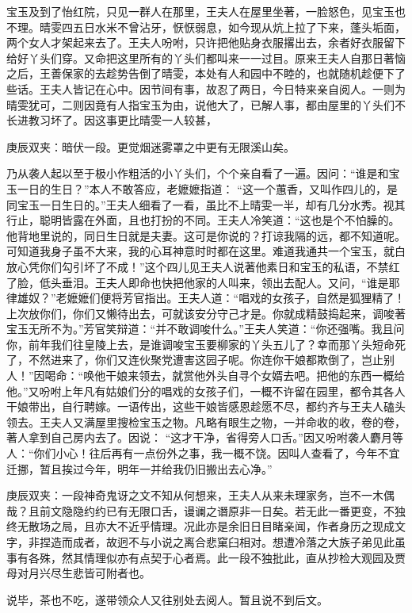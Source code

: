 \begin{parag}
    宝玉及到了怡红院，只见一群人在那里，王夫人在屋里坐著，一脸怒色，见宝玉也不理。晴雯四五日水米不曾沾牙，恹恹弱息，如今现从炕上拉了下来，蓬头垢面，两个女人才架起来去了。王夫人吩咐，只许把他贴身衣服撂出去，余者好衣服留下给好丫头们穿。又命把这里所有的丫头们都叫来一一过目。原来王夫人自那日著恼之后，王善保家的去趁势告倒了晴雯，本处有人和园中不睦的，也就随机趁便下了些话。王夫人皆记在心中。因节间有事，故忍了两日，今日特来亲自阅人。一则为晴雯犹可，二则因竟有人指宝玉为由，说他大了，已解人事，都由屋里的丫头们不长进教习坏了。因这事更比晴雯一人较甚，\begin{note}庚辰双夹：暗伏一段。更觉烟迷雾罩之中更有无限溪山矣。\end{note}乃从袭人起以至于极小作粗活的小丫头们，个个亲自看了一遍。因问：“谁是和宝玉一日的生日？”本人不敢答应，老嬷嬷指道： “这一个蕙香，又叫作四儿的，是同宝玉一日生日的。”王夫人细看了一看，虽比不上晴雯一半，却有几分水秀。视其行止，聪明皆露在外面，且也打扮的不同。王夫人冷笑道：“这也是个不怕臊的。他背地里说的，同日生日就是夫妻。这可是你说的？打谅我隔的远，都不知道呢。可知道我身子虽不大来，我的心耳神意时时都在这里。难道我通共一个宝玉，就白放心凭你们勾引坏了不成！”这个四儿见王夫人说著他素日和宝玉的私语，不禁红了脸，低头垂泪。王夫人即命也快把他家的人叫来，领出去配人。又问，“谁是耶律雄奴？”老嬷嬷们便将芳官指出。王夫人道：“唱戏的女孩子，自然是狐狸精了！上次放你们，你们又懒待出去，可就该安分守己才是。你就成精鼓捣起来，调唆著宝玉无所不为。”芳官笑辩道：“并不敢调唆什么。”王夫人笑道：“你还强嘴。我且问你，前年我们往皇陵上去，是谁调唆宝玉要柳家的丫头五儿了？幸而那丫头短命死了，不然进来了，你们又连伙聚党遭害这园子呢。你连你干娘都欺倒了，岂止别人！”因喝命：“唤他干娘来领去，就赏他外头自寻个女婿去吧。把他的东西一概给他。”又吩咐上年凡有姑娘们分的唱戏的女孩子们，一概不许留在园里，都令其各人干娘带出，自行聘嫁。一语传出，这些干娘皆感恩趁愿不尽，都约齐与王夫人磕头领去。王夫人又满屋里搜检宝玉之物。凡略有眼生之物，一并命收的收，卷的卷，著人拿到自己房内去了。因说： “这才干净，省得旁人口舌。”因又吩咐袭人麝月等人：“你们小心！往后再有一点份外之事，我一概不饶。因叫人查看了，今年不宜迁挪，暂且挨过今年，明年一并给我仍旧搬出去心净。”\begin{note}庚辰双夹：一段神奇鬼讶之文不知从何想来，王夫人从来未理家务，岂不一木偶哉？且前文隐隐约约已有无限口舌，谩谰之谮原非一日矣。若无此一番更变，不独终无散场之局，且亦大不近乎情理。况此亦是余旧日目睹亲闻，作者身历之现成文字，非捏造而成者，故迥不与小说之离合悲窠臼相对。想遭冷落之大族子弟见此虽事有各殊，然其情理似亦有点契于心者焉。此一段不独批此，直从抄检大观园及贾母对月兴尽生悲皆可附者也。\end{note}说毕，茶也不吃，遂带领众人又往别处去阅人。暂且说不到后文。
\end{parag}


